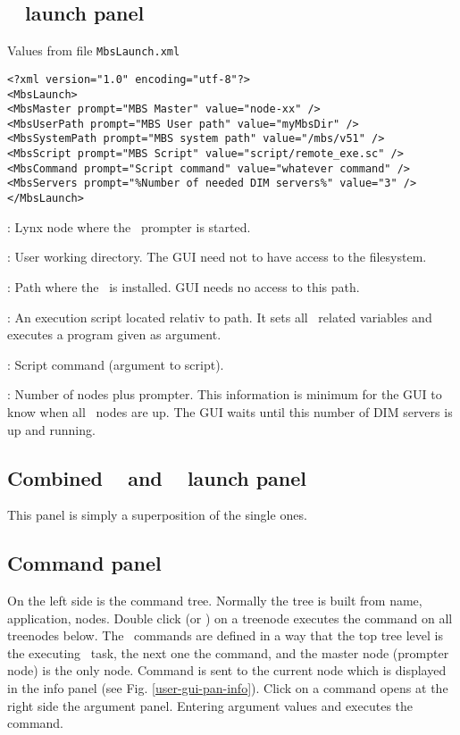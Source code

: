 {\subsection{\mbs~ launch panel}
Values from file {\tt MbsLaunch.xml}
{\small \begin{verbatim}
<?xml version="1.0" encoding="utf-8"?>
<MbsLaunch>
<MbsMaster prompt="MBS Master" value="node-xx" />
<MbsUserPath prompt="MBS User path" value="myMbsDir" />
<MbsSystemPath prompt="MBS system path" value="/mbs/v51" />
<MbsScript prompt="MBS Script" value="script/remote_exe.sc" />
<MbsCommand prompt="Script command" value="whatever command" />
<MbsServers prompt="%Number of needed DIM servers%" value="3" />
</MbsLaunch>
\end{verbatim}
\bdes
\item[MbsMaster]: Lynx node where the \mbs\ prompter is started.
\item[MbsUserPath]: User working directory. The GUI need not to have
access to the filesystem.
\item[MbsSystemPath]:  Path where the \mbs\ is installed. GUI needs no access to this path.
\item[MbsScript]: An execution script located relativ to \mbs path.
It sets all \mbs\ related variables and executes a program given as argument.
\item[MbsCommand]: Script command (argument to script).
\item[MbsServers]: Number of nodes plus prompter. This information
is minimum for the GUI to know when all \mbs\ nodes are up. The GUI waits until
this number of DIM servers is up and running.
\edes
\subsection{Combined \dabc~ and \mbs~ launch panel}
This panel is simply a superposition of the single ones.
\subsection{Command panel}
On the left side is the command tree. Normally the tree is built
from name, application, nodes. Double click (or ) on a treenode
executes the command on all treenodes below. The \mbs\ commands
are defined in a way that the top tree level is the executing \mbs\ task,
the next one the command, and the master node (prompter node) is the only node.
Command is sent to the current node which is displayed in the info panel
(see Fig. \ref{user-gui-pan-info}).
Click on a command opens at the right side the argument panel.
Entering argument values and  executes the command.
}}

